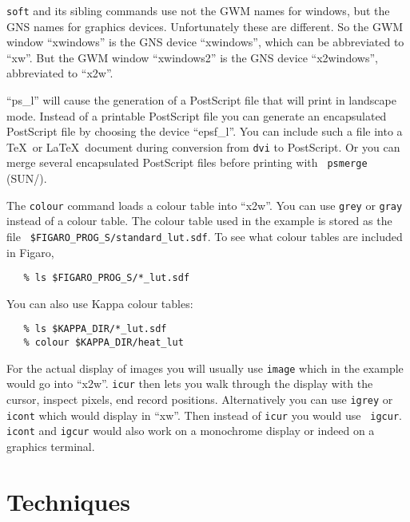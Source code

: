 {\tt soft} and its sibling commands use not the GWM names for windows,
but the GNS names for graphics devices.  Unfortunately these are
different.  So the GWM window ``xwindows'' is the GNS device
``xwindows'', which can be abbreviated to ``xw''.  But the GWM window
``xwindows2'' is the GNS device ``x2windows'', abbreviated to ``x2w''.

``ps\_l'' will cause the generation of a PostScript file that will print
in landscape mode.  Instead of a printable PostScript file you can
generate an encapsulated PostScript file by choosing the device
``epsf\_l''.  You can include such a file into a \TeX\ or \LaTeX\
document during conversion from {\tt dvi} to PostScript.  Or you can
merge several encapsulated PostScript files before printing with {\tt
psmerge} (SUN/\-164).

The {\tt colour} command loads a colour table into ``x2w''.  You can use
{\tt grey} or {\tt gray} instead of a colour table.  The colour table
used in the example is stored as the file {\tt
\$FIGARO\_PROG\_S/stan\-dard\-\_lut.sdf}.  To see what colour tables are
included in Figaro,

\begin{verbatim}
   % ls $FIGARO_PROG_S/*_lut.sdf
\end{verbatim}

You can also use Kappa colour tables:

\begin{verbatim}
   % ls $KAPPA_DIR/*_lut.sdf
   % colour $KAPPA_DIR/heat_lut
\end{verbatim}

For the actual display of images you will usually use {\tt image} which
in the example would go into ``x2w''.  {\tt icur} then lets you walk
through the display with the cursor, inspect pixels, end record
positions.  Alternatively you can use {\tt igrey} or {\tt icont} which
would display in ``xw''.  Then instead of {\tt icur} you would use {\tt
igcur}.  {\tt icont} and {\tt igcur} would also work on a monochrome
display or indeed on a graphics terminal.



\section{Techniques}
\label{techno}

